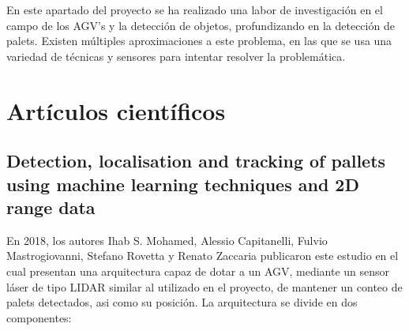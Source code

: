 
En este apartado del proyecto se ha realizado una labor de investigación en el campo de los AGV's y la detección de objetos, profundizando en la detección de palets.
Existen múltiples aproximaciones a este problema, en las que se usa una variedad de técnicas y sensores para intentar resolver la problemática.

\section{Artículos científicos}

\subsection{Detection, localisation and tracking of pallets using machine
learning techniques and 2D range data}
En 2018, los autores Ihab S. Mohamed, Alessio Capitanelli, Fulvio Mastrogiovanni, Stefano Rovetta y Renato Zaccaria publicaron este estudio en el cual presentan una arquitectura capaz de dotar a un AGV, mediante un sensor láser de tipo LIDAR similar al utilizado en el proyecto, de mantener un conteo de palets detectados, asi como su posición.
La arquitectura se divide en dos componentes:
